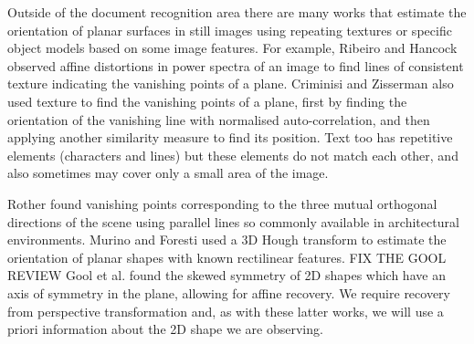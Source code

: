 \documentclass{elsart}   %
\begin{document}
Outside of the document recognition area there are  many works that
estimate the orientation of planar surfaces in still images 
using  repeating textures or specific object models based on some image features.
For example, Ribeiro and Hancock \cite{ribeiro}
observed affine distortions in power spectra of an image to find lines of
consistent texture indicating the vanishing points of a plane. Criminisi and
Zisserman \cite{zisserman} also used texture to find the vanishing points of a
plane,  first by finding the orientation of the vanishing line with normalised
auto-correlation, and then applying another similarity measure to find its position.
Text too has repetitive elements (characters and lines) but
these elements do not match each other, and also sometimes may cover only a
small area of the image.



Rother \cite{rother0} found vanishing points  corresponding  to the three mutual
orthogonal directions of the scene using parallel lines so commonly
available in architectural environments.  Murino and
Foresti \cite{MURIN} used a 3D Hough transform to estimate the orientation of
planar shapes with known rectilinear features. FIX THE GOOL REVIEW Gool et al. 
\cite{GOOL} %
found the skewed symmetry of 2D shapes which have an axis of
symmetry in the plane, allowing for affine recovery.  We require recovery from
perspective transformation and, as with these latter works, we will use a priori
information about the 2D shape we are observing.
\end{document}
